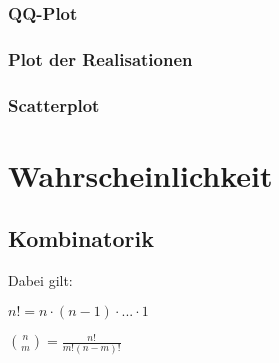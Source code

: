 \documentclass[8pt]{extarticle}
\begin{document}
\subsubsection{QQ-Plot}

\subsubsection{Plot der Realisationen}

\subsubsection{Scatterplot}




\section{Wahrscheinlichkeit}

\subsection{Kombinatorik}

\begin{minipage}[t]{0.7\textwidth}
\end{minipage}
\begin{Mathspez}
\begin{minipage}[b]{0.2\textwidth}
Dabei gilt: 


 $n!=n\cdot (n-1)\cdot ... \cdot 1$

 $\binom{n}{m} = \frac{n!}{m!(n-m)!}$

\end{minipage}
\end{Mathspez}
\end{document}
